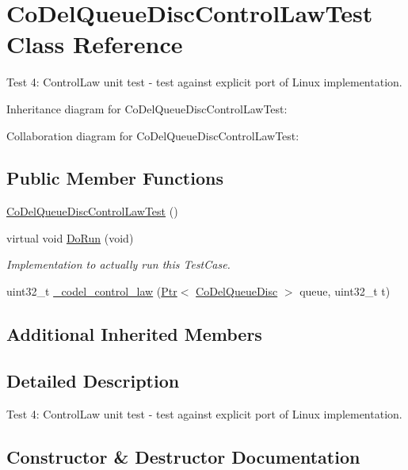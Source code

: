 \hypertarget{classCoDelQueueDiscControlLawTest}{}\section{Co\+Del\+Queue\+Disc\+Control\+Law\+Test Class Reference}
\label{classCoDelQueueDiscControlLawTest}


Test 4\+: Control\+Law unit test -\/ test against explicit port of Linux implementation.  




Inheritance diagram for Co\+Del\+Queue\+Disc\+Control\+Law\+Test\+:


Collaboration diagram for Co\+Del\+Queue\+Disc\+Control\+Law\+Test\+:
\subsection*{Public Member Functions}
\begin{DoxyCompactItemize}
\item 
\hyperlink{classCoDelQueueDiscControlLawTest_a98f3d5e4d80586dfef0f26c956a267cd}{Co\+Del\+Queue\+Disc\+Control\+Law\+Test} ()
\item 
virtual void \hyperlink{classCoDelQueueDiscControlLawTest_a9c38e39f5749875e5a0898aedbd4f2b3}{Do\+Run} (void)
\begin{DoxyCompactList}\small\item\em Implementation to actually run this Test\+Case. \end{DoxyCompactList}\item 
uint32\+\_\+t \hyperlink{classCoDelQueueDiscControlLawTest_aa22c6432dec88a53567674c55c29f216}{\+\_\+codel\+\_\+control\+\_\+law} (\hyperlink{classns3_1_1Ptr}{Ptr}$<$ \hyperlink{classns3_1_1CoDelQueueDisc}{Co\+Del\+Queue\+Disc} $>$ queue, uint32\+\_\+t t)
\end{DoxyCompactItemize}
\subsection*{Additional Inherited Members}


\subsection{Detailed Description}
Test 4\+: Control\+Law unit test -\/ test against explicit port of Linux implementation. 

\subsection{Constructor \& Destructor Documentation}
